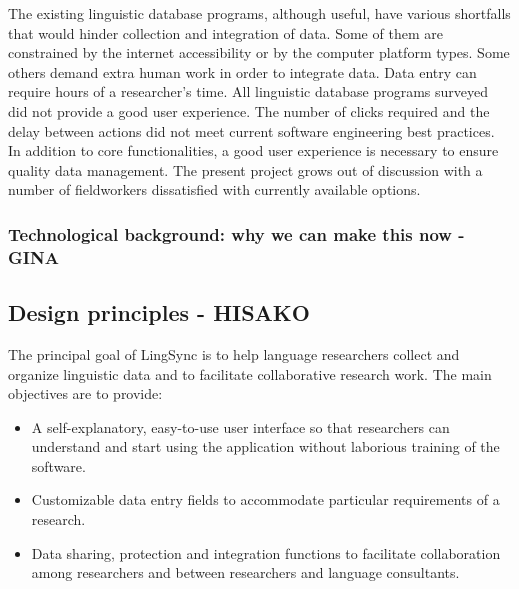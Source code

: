 \documentclass[letterpaper, 12pt, dvips]{mitwpl}
\begin{document}
The existing linguistic database programs, although useful, have various shortfalls
that would hinder collection and integration of data. Some of them are constrained by
the internet accessibility or by the computer platform types. Some others demand extra
human work in order to integrate data. Data entry can require hours of a researcher's
time. All linguistic database programs surveyed did not provide a good user experience.
The number of clicks required and the delay between actions did not meet current
software engineering best practices. In addition to core functionalities, a good user
experience is necessary to ensure quality data management. The present project grows
out of discussion with a number of fieldworkers dissatisfied with currently available
options.


\subsubsection{Technological background: why we can make this now - GINA} 

\subsection{Design principles - HISAKO} 
\label{sec:design}

The principal goal of LingSync is to help language researchers collect and organize linguistic data and to facilitate collaborative research work. The main objectives are to provide: 

\begin{itemize} 
\item A self-explanatory, easy-to-use user interface so that researchers can understand and start using the application without laborious training of the software.  
\item Customizable data entry fields to accommodate particular requirements of a research.  
\item Data sharing, protection and integration functions to facilitate collaboration among researchers and between researchers and language consultants. 
\end{itemize} 

\end{document}
